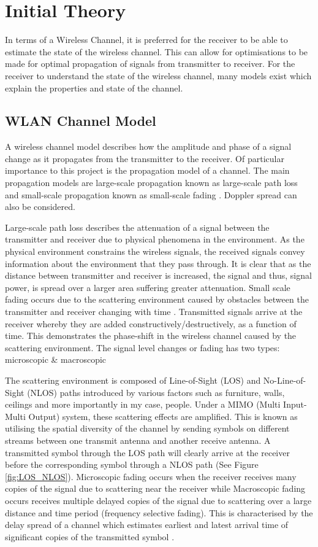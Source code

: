 \section{Initial Theory}
In terms of a Wireless Channel, it is preferred for the receiver to be able to estimate the state of the wireless channel. This can allow for optimisations to be made for optimal propagation of signals from transmitter to receiver. For the receiver to understand the state of the wireless channel, many models exist which explain the properties and state of the channel.
\subsection{WLAN Channel Model}
A wireless channel model describes how the amplitude and phase of a signal change as it propagates from the transmitter to the receiver. Of particular importance to this project is the propagation model of a channel. The main propagation models are large-scale propagation known as large-scale path loss and small-scale propagation known as small-scale fading \citep{articleWLAN}. Doppler spread can also be considered. \par
Large-scale path loss describes the attenuation of a signal between the transmitter and receiver due to physical phenomena in the environment. As the physical environment constrains the wireless signals, the received signals convey information about the environment that they pass through. It is clear that as the distance between transmitter and receiver is increased, the signal and thus, signal power, is spread over a larger area suffering greater attenuation. Small scale fading occurs due to the scattering environment caused by obstacles between the transmitter and receiver changing with time \citep{articleWLAN}. Transmitted signals arrive at the receiver whereby they are added constructively/destructively, as a function of time. This demonstrates the phase-shift in the wireless channel caused by the scattering environment. The signal level changes or fading has two types: microscopic \& macroscopic \citep{channelModels}\par
The scattering environment is composed of Line-of-Sight (LOS) and No-Line-of-Sight (NLOS) paths introduced by various factors such as furniture, walls, ceilings and more importantly in my case, people. Under a MIMO (Multi Input-Multi Output) system, these scattering effects are amplified. This is known as utilising the spatial diversity of the channel by sending symbols on different streams between one transmit antenna and another receive antenna. A transmitted symbol through the LOS path will clearly arrive at the receiver before the corresponding symbol through a NLOS path (See Figure \ref{fig:LOS_NLOS}). Microscopic fading occurs when the receiver receives many copies of the signal due to scattering near the receiver while Macroscopic fading occurs receives multiple delayed copies of the signal due to scattering over a large distance and time period (frequency selective fading). This is characterised by the delay spread of a channel which estimates earliest and latest arrival time of significant copies of the transmitted symbol \citep{channelModels, articleWLAN}. \par
